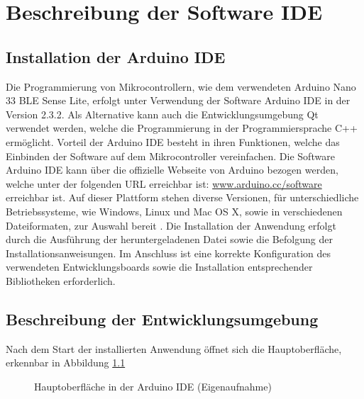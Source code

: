 %
%
%

\chapter{Beschreibung der Software IDE}

\section{Installation der Arduino IDE}

Die Programmierung von Mikrocontrollern, wie dem verwendeten Arduino Nano 33 BLE Sense Lite, erfolgt unter Verwendung der Software Arduino IDE in der Version 2.3.2.  
Als Alternative kann auch die Entwicklungsumgebung Qt verwendet werden, welche die Programmierung in der Programmiersprache C++ ermöglicht. Vorteil der Arduino IDE besteht in ihren Funktionen, welche das Einbinden der Software auf dem Mikrocontroller vereinfachen. Die Software Arduino IDE kann über die offizielle Webseite von Arduino bezogen werden, welche unter der folgenden URL erreichbar ist: \url{www.arduino.cc/software} erreichbar ist. Auf dieser Plattform stehen diverse Versionen, für unterschiedliche Betriebssysteme, wie Windows, Linux und Mac OS X, sowie in verschiedenen Dateiformaten, zur Auswahl bereit \cite{ArdIDE.2024}. Die Installation der Anwendung erfolgt durch die Ausführung der heruntergeladenen Datei sowie die Befolgung der Installationsanweisungen. Im Anschluss ist eine korrekte Konfiguration des verwendeten Entwicklungsboards sowie die Installation entsprechender Bibliotheken erforderlich.

\section{Beschreibung der Entwicklungsumgebung}

Nach dem Start der installierten Anwendung öffnet sich die Hauptoberfläche, erkennbar in Abbildung \ref{HauptoeberflIDE}

\begin{figure}[H]
	\begin{center}
		\caption{Hauptoberfläche in der Arduino IDE (Eigenaufnahme)} \label{HauptoeberflIDE}
	\end{center}
\end{figure}


